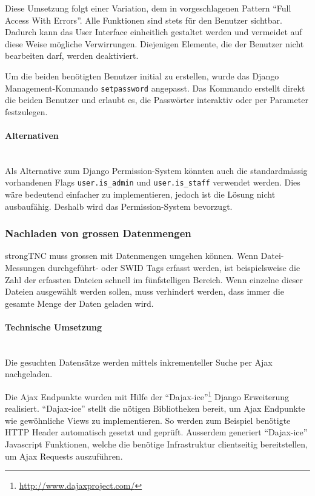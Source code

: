 Diese Umsetzung folgt einer Variation, dem in \cite{posa1} vorgeschlagenen Pattern \enquote{Full Access With Errors}. Alle Funktionen sind stets für den Benutzer sichtbar. Dadurch kann das User Interface einheitlich gestaltet werden und vermeidet auf diese Weise mögliche Verwirrungen. Diejenigen Elemente, die der Benutzer nicht bearbeiten darf, werden deaktiviert. 

Um die beiden benötigten Benutzer initial zu erstellen, wurde das Django
Management-Kommando \texttt{setpassword} angepasst. Das Kommando erstellt direkt
die beiden Benutzer und erlaubt es, die Passwörter interaktiv oder per Parameter
festzulegen.

\paragraph{Alternativen} \hspace{0px} \\
Als Alternative zum Django Permission-System könnten auch die standardmässig
vorhandenen Flags \texttt{user.is\_admin} und \texttt{user.is\_staff} verwendet
werden. Dies wäre bedeutend einfacher zu implementieren, jedoch ist die Lösung
nicht ausbaufähig. Deshalb wird das Permission-System bevorzugt.

\subsubsection{Nachladen von grossen Datenmengen}
strongTNC muss grossen mit Datenmengen umgehen können. Wenn Datei-Messungen
durchgeführt- oder SWID Tags erfasst werden, ist beispielsweise die Zahl der
erfassten Dateien schnell im fünfstelligen Bereich. Wenn einzelne dieser Dateien
ausgewählt werden sollen, muss verhindert werden, dass immer die gesamte Menge
der Daten geladen wird.

\paragraph{Technische Umsetzung} \hspace{0pt} \\
Die gesuchten Datensätze werden mittels inkrementeller Suche per Ajax
nachgeladen.

Die Ajax Endpunkte wurden mit Hilfe der \enquote{Dajax-ice}\footnote{\url{http://www.dajaxproject.com/}} Django Erweiterung realisiert.
\enquote{Dajax-ice} stellt die nötigen Bibliotheken bereit, um Ajax Endpunkte wie gewöhnliche Views zu implementieren. So werden zum Beispiel benötigte HTTP Header
automatisch gesetzt und geprüft. Ausserdem generiert \enquote{Dajax-ice} Javascript Funktionen, welche die benötige Infrastruktur clientseitig bereitstellen, um Ajax Requests auszuführen.
\\

